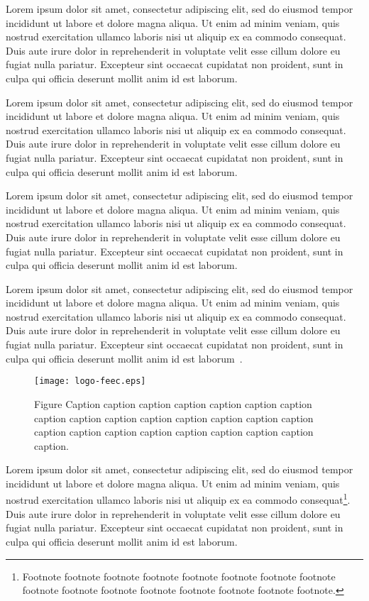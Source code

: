 \documentclass[Ingles]{feec-tese-v1}
\begin{document}
Lorem ipsum dolor sit amet, consectetur adipiscing elit, sed do eiusmod
tempor incididunt ut labore et dolore magna aliqua. Ut enim ad minim
veniam, quis nostrud exercitation ullamco laboris nisi ut aliquip ex ea
commodo consequat. Duis aute irure dolor in reprehenderit in voluptate
velit esse cillum dolore eu fugiat nulla pariatur. Excepteur sint occaecat
cupidatat non proident, sunt in culpa qui officia deserunt mollit anim id
est laborum.

Lorem ipsum dolor sit amet, consectetur adipiscing elit, sed do eiusmod
tempor incididunt ut labore et dolore magna aliqua. Ut enim ad minim
veniam, quis nostrud exercitation ullamco laboris nisi ut aliquip ex ea
commodo consequat. Duis aute irure dolor in reprehenderit in voluptate
velit esse cillum dolore eu fugiat nulla pariatur. Excepteur sint occaecat
cupidatat non proident, sunt in culpa qui officia deserunt mollit anim id
est laborum.

Lorem ipsum dolor sit amet, consectetur adipiscing elit, sed do eiusmod
tempor incididunt ut labore et dolore magna aliqua. Ut enim ad minim
veniam, quis nostrud exercitation ullamco laboris nisi ut aliquip ex ea
commodo consequat. Duis aute irure dolor in reprehenderit in voluptate
velit esse cillum dolore eu fugiat nulla pariatur. Excepteur sint occaecat
cupidatat non proident, sunt in culpa qui officia deserunt mollit anim id
est laborum.

Lorem ipsum dolor sit amet, consectetur adipiscing elit, sed do eiusmod
tempor incididunt ut labore et dolore magna aliqua. Ut enim ad minim
veniam, quis nostrud exercitation ullamco laboris nisi ut aliquip ex ea
commodo consequat. Duis aute irure dolor in reprehenderit in voluptate
velit esse cillum dolore eu fugiat nulla pariatur. Excepteur sint occaecat
cupidatat non proident, sunt in culpa qui officia deserunt mollit anim id
est laborum~\cite{2014-bic,2015-ela}.

\begin{figure}
\centerline{\texttt{[image: logo-feec.eps]}}
\caption[Shorter figure caption]{Figure Caption caption caption caption
  caption caption caption caption caption caption caption caption caption
  caption caption caption caption caption caption caption caption caption
  caption caption.}
\label{f:label1}
\end{figure}

Lorem ipsum dolor sit amet, consectetur adipiscing elit, sed do eiusmod
tempor incididunt ut labore et dolore magna aliqua. Ut enim ad minim
veniam, quis nostrud exercitation ullamco laboris nisi ut aliquip ex ea
commodo consequat\footnote{Footnote footnote footnote footnote footnote
  footnote footnote footnote footnote footnote footnote footnote footnote
  footnote footnote footnote.}.  Duis aute irure dolor in reprehenderit in
voluptate velit esse cillum dolore eu fugiat nulla pariatur. Excepteur sint
occaecat cupidatat non proident, sunt in culpa qui officia deserunt mollit
anim id est laborum.
\end{document}
